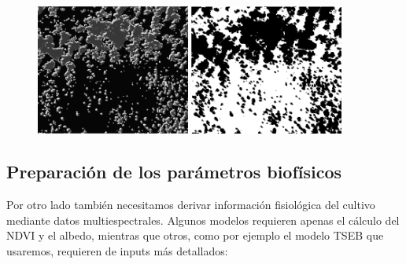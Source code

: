 \documentclass[a4paper,11pt]{article}
\begin{document}
    \begin{figure}[H]\centering
     \includegraphics[width=0.45\textwidth]{qa_pixel}
     \includegraphics[width=0.45\textwidth]{mask_result}
    \end{figure}
    
  \subsection{Preparación de los parámetros biofísicos}
    Por otro lado también necesitamos derivar información fisiológica del cultivo mediante datos multiespectrales. Algunos modelos requieren apenas el cálculo del NDVI y el albedo, mientras que otros, como por ejemplo el modelo TSEB que usaremos, requieren de inputs más detallados:
\end{document}
